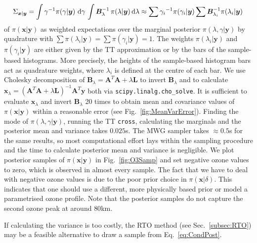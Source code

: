 \begin{align}
	\Sigma_{\bm{x}|\bm{y}} = \int \gamma^{-1}  \pi(\gamma | \bm{y} ) \, \mathop{}\!\mathrm{d} \gamma \, \int  \bm{B}_{\lambda}^{-1} \, \pi(\lambda | \bm{y} )  \, \text{d} \lambda  \approx \sum {\gamma_i}^{-1}\pi(\gamma_i| \bm{y}) \sum \bm{B}_{\lambda_i}^{-1}\pi(\lambda_i| \bm{y})\, \label{eq:CovInt}
\end{align}
of $\pi(\bm{x}| \bm{y})$ as weighted expectations over the marginal posterior $\pi(\lambda,\gamma | \bm{y})$ by quadrature \cite[Sec. 2.1]{Dick_Kuo_Sloan_2013} with $\sum \pi(\lambda_i| \bm{y}) = \sum \pi(\gamma_i| \bm{y}) = 1$.
The weights $\pi(\lambda_i| \bm{y})$ and $\pi(\gamma_i| \bm{y})$ are either given by the TT approximation or by the bars of the sample-based histograms.
More precisely, the heights of the sample-based histogram bars act as quadrature weights, where $\lambda_i$ is defined at the centre of each bar.
We use Cholesky decomposition of $\bm{B}_{\lambda} = \bm{A}^T \bm{A} + \lambda \bm{L}$ to invert $\bm{B}_{\lambda}$ and to calculate $\bm{x}_{\lambda} = (\bm{A}^T \bm{A} + \lambda \bm{L} )^{-1} \bm{A}^T \bm{y}$ both via \texttt{scipy.linalg.cho\_solve}.
It is sufficient to evaluate $\bm{x}_{\lambda}$ and invert $\bm{B}_{\lambda}$ 20 times to obtain mean and covariance values of $\pi(\bm{x}|\bm{y})$ within a reasonable error (see Fig.~\ref{fig:MeanVarError}).
Finding the mode of $\pi(\lambda,\gamma|\bm{y})$, running the TT \texttt{cross}, calculating the marginals and the posterior mean and variance takes $0.025$s.
The MWG sampler takes $\approx0.5$s for the same results, so most computational effort lays within the sampling procedure and the time to calculate posterior mean and variance is negligible.
We plot posterior samples of $\pi(\bm{x}|\bm{y})$ in Fig.~\ref{fig:O3Samp} and set negative ozone values to zero, which is observed in almost every sample.
The fact that we have to deal with negative ozone values is due to the poor prior choice in $\pi(\bm{x}|\delta)$.
This indicates that one should use a different, more physically based prior or model a parametrised ozone profile.
Note that the posterior samples do not capture the second ozone peak at around $80$km.

If calculating the variance is too costly, the RTO method (see Sec.~\ref{subsec:RTO}) may be a feasible alternative to draw a sample from Eq.~\ref{eq:CondPost}.


